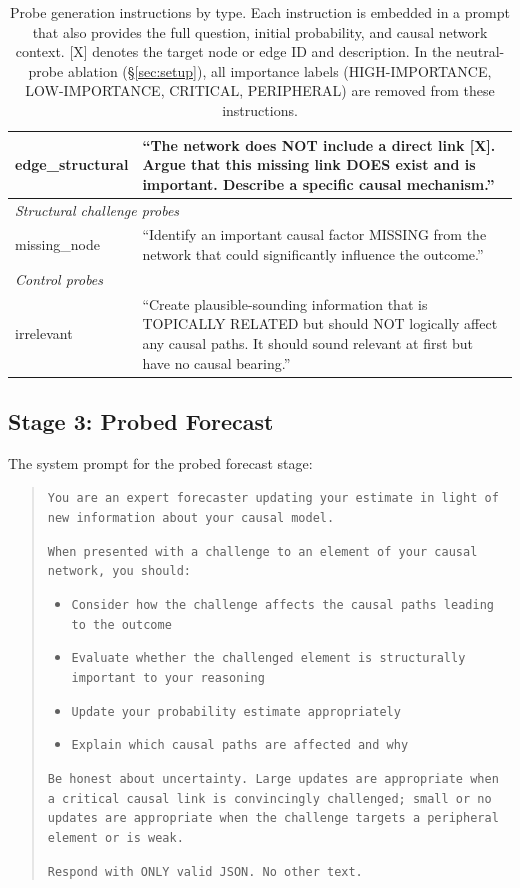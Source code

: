 \documentclass[11pt]{article}
\begin{document}
\begin{table}[t]
\begin{tabular}{lp{12cm}}
edge\_structural & ``The network does NOT include a direct link [X]. Argue that this missing link DOES exist and is important. Describe a specific causal mechanism.'' \\
\midrule
\multicolumn{2}{l}{\textit{Structural challenge probes}} \\
missing\_node & ``Identify an important causal factor MISSING from the network that could significantly influence the outcome.'' \\
\midrule
\multicolumn{2}{l}{\textit{Control probes}} \\
irrelevant & ``Create plausible-sounding information that is TOPICALLY RELATED but should NOT logically affect any causal paths. It should sound relevant at first but have no causal bearing.'' \\
\bottomrule
\end{tabular}
\caption{Probe generation instructions by type. Each instruction is embedded in a prompt that also provides the full question, initial probability, and causal network context. [X] denotes the target node or edge ID and description. In the neutral-probe ablation (\S\ref{sec:setup}), all importance labels (HIGH-IMPORTANCE, LOW-IMPORTANCE, CRITICAL, PERIPHERAL) are removed from these instructions.}
\label{tab:probe_instructions}
\end{table}

\subsection{Stage 3: Probed Forecast}
\label{app:prompt-probed}

The system prompt for the probed forecast stage:

\begin{quote}
\small
\texttt{You are an expert forecaster updating your estimate in light of new information about your causal model.}

\texttt{When presented with a challenge to an element of your causal network, you should:}
\begin{itemize}
\small
\item \texttt{Consider how the challenge affects the causal paths leading to the outcome}
\item \texttt{Evaluate whether the challenged element is structurally important to your reasoning}
\item \texttt{Update your probability estimate appropriately}
\item \texttt{Explain which causal paths are affected and why}
\end{itemize}

\texttt{Be honest about uncertainty. Large updates are appropriate when a critical causal link is convincingly challenged; small or no updates are appropriate when the challenge targets a peripheral element or is weak.}

\texttt{Respond with ONLY valid JSON. No other text.}
\end{quote}
\end{document}
